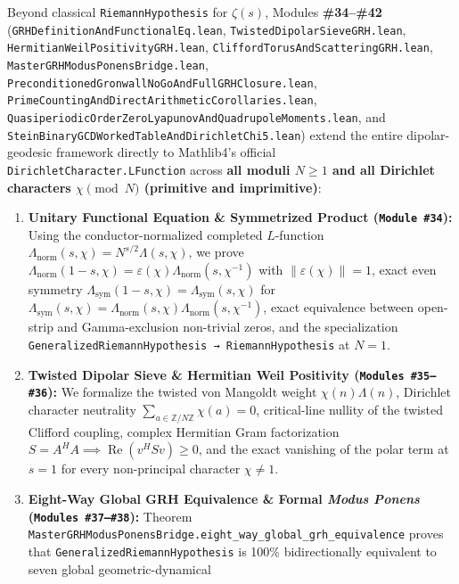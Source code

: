 \documentclass[
  11pt,
]{article}
\providecommand{\tightlist}{%
  \setlength{\itemsep}{0pt}\setlength{\parskip}{0pt}}
\begin{document}
Beyond classical \texttt{RiemannHypothesis} for \(\zeta(s)\), Modules
\textbf{\#34--\#42} (\texttt{GRHDefinitionAndFunctionalEq.lean},
\texttt{TwistedDipolarSieveGRH.lean},
\texttt{HermitianWeilPositivityGRH.lean},
\texttt{CliffordTorusAndScatteringGRH.lean},
\texttt{MasterGRHModusPonensBridge.lean},
\texttt{PreconditionedGronwallNoGoAndFullGRHClosure.lean},
\texttt{PrimeCountingAndDirectArithmeticCorollaries.lean},
\texttt{QuasiperiodicOrderZeroLyapunovAndQuadrupoleMoments.lean}, and
\texttt{SteinBinaryGCDWorkedTableAndDirichletChi5.lean}) extend the
entire dipolar-geodesic framework directly to Mathlib4's official
\texttt{DirichletCharacter.LFunction} across \textbf{all moduli
\(N \ge 1\) and all Dirichlet characters \(\chi \pmod N\) (primitive and
imprimitive)}:

\begin{enumerate}
\def\labelenumi{\arabic{enumi}.}
\tightlist
\item
  \textbf{Unitary Functional Equation \& Symmetrized Product
  (\texttt{Module\ \#34}):} Using the conductor-normalized completed
  \(L\)-function
  \(\Lambda_{\text{norm}}(s, \chi) = N^{s/2}\Lambda(s, \chi)\), we prove
  \(\Lambda_{\text{norm}}(1-s, \chi) = \varepsilon(\chi)\Lambda_{\text{norm}}(s, \chi^{-1})\)
  with \(\|\varepsilon(\chi)\| = 1\), exact even symmetry
  \(\Lambda_{\text{sym}}(1-s, \chi) = \Lambda_{\text{sym}}(s, \chi)\)
  for
  \(\Lambda_{\text{sym}}(s,\chi) = \Lambda_{\text{norm}}(s,\chi)\Lambda_{\text{norm}}(s,\chi^{-1})\),
  exact equivalence between open-strip and Gamma-exclusion non-trivial
  zeros, and the specialization
  \texttt{GeneralizedRiemannHypothesis\ →\ RiemannHypothesis} at
  \(N = 1\).
\item
  \textbf{Twisted Dipolar Sieve \& Hermitian Weil Positivity
  (\texttt{Modules\ \#35–\#36}):} We formalize the twisted von Mangoldt
  weight \(\chi(n)\Lambda(n)\), Dirichlet character neutrality
  \(\sum_{a\in\mathbb{Z}/N\mathbb{Z}}\chi(a)=0\), critical-line nullity
  of the twisted Clifford coupling, complex Hermitian Gram factorization
  \(S = A^H A \implies \operatorname{Re}(v^H S v) \ge 0\), and the exact
  vanishing of the polar term at \(s=1\) for every non-principal
  character \(\chi \ne 1\).
\item
  \textbf{Eight-Way Global GRH Equivalence \& Formal \emph{Modus Ponens}
  (\texttt{Modules\ \#37–\#38}):} Theorem
  \texttt{MasterGRHModusPonensBridge.eight\_way\_global\_grh\_equivalence}
  proves that \texttt{GeneralizedRiemannHypothesis} is 100\%
  bidirectionally equivalent to seven global geometric-dynamical

\end{enumerate}
\end{document}
